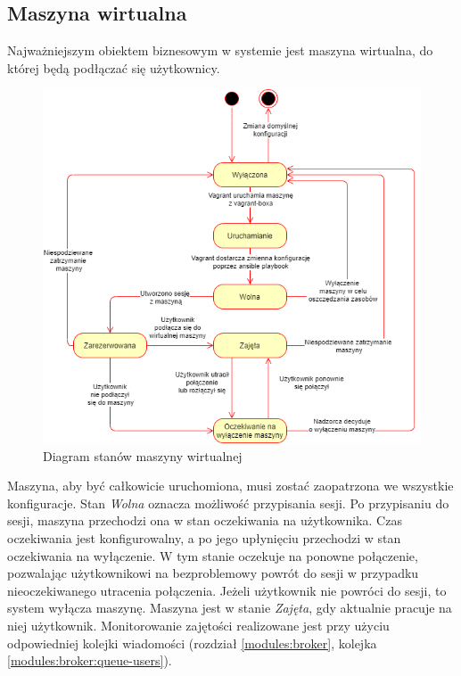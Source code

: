 \documentclass[../opis-rozwiazania.tex]{subfiles}
\begin{document}
\label{state_diagrams}

\subsection{Maszyna wirtualna}
Najważniejszym obiektem biznesowym w systemie jest maszyna wirtualna, do której będą podłączać się użytkownicy.

\begin{figure}[H]
  \centering
  \includegraphics[width=\textwidth]{../diagrams/state_diagrams/virtual_machine.png}
  \caption{Diagram stanów maszyny wirtualnej}
  \label{state_vm}
\end{figure}

Maszyna, aby być całkowicie uruchomiona, musi zostać zaopatrzona we wszystkie konfiguracje.
Stan \textit{Wolna} oznacza możliwość przypisania sesji.
Po przypisaniu do sesji, maszyna przechodzi ona w stan oczekiwania na użytkownika. Czas oczekiwania jest konfigurowalny, a po jego upłynięciu przechodzi w stan oczekiwania na wyłączenie.
W tym stanie oczekuje na ponowne połączenie, pozwalając użytkownikowi na bezproblemowy powrót do sesji w przypadku nieoczekiwanego utracenia połączenia. Jeżeli użytkownik nie powróci do sesji, to system wyłącza maszynę.
Maszyna jest w stanie \textit{Zajęta}, gdy aktualnie pracuje na niej użytkownik. Monitorowanie zajętości realizowane jest przy użyciu odpowiedniej kolejki wiadomości (rozdział \ref{modules:broker}, kolejka \ref{modules:broker:queue-users}).
\end{document}
